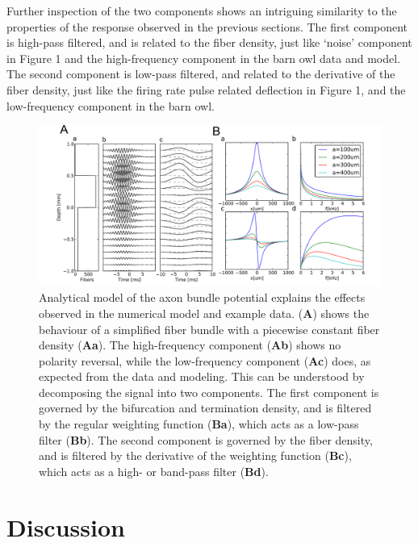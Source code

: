 \documentclass[]{article}
\begin{document}
Further inspection of the two components shows an intriguing similarity
to the properties of the response observed in the previous sections. The
first component is high-pass filtered, and is related to the fiber
density, just like `noise' component in Figure 1 and the high-frequency
component in the barn owl data and model. The second component is
low-pass filtered, and related to the derivative of the fiber density,
just like the firing rate pulse related deflection in Figure 1, and the
low-frequency component in the barn owl.

\begin{figure}[htbp]
\centering
\includegraphics{../figs/mockups/fig5.pdf}
\caption{Analytical model of the axon bundle potential explains the
effects observed in the numerical model and example data. (\textbf{A})
shows the behaviour of a simplified fiber bundle with a piecewise
constant fiber density (\textbf{Aa}). The high-frequency component
(\textbf{Ab}) shows no polarity reversal, while the low-frequency
component (\textbf{Ac}) does, as expected from the data and modeling.
This can be understood by decomposing the signal into two components.
The first component is governed by the bifurcation and termination
density, and is filtered by the regular weighting function
(\textbf{Ba}), which acts as a low-pass filter (\textbf{Bb}). The second
component is governed by the fiber density, and is filtered by the
derivative of the weighting function (\textbf{Bc}), which acts as a
high- or band-pass filter (\textbf{Bd}).}
\end{figure}

\section{Discussion}\label{discussion}
\end{document}
